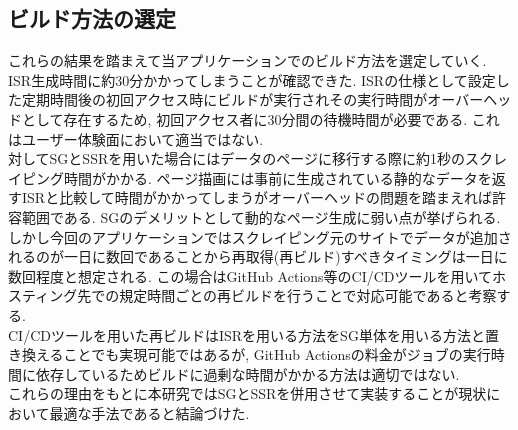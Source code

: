 \subsection{ビルド方法の選定}
これらの結果を踏まえて当アプリケーションでのビルド方法を選定していく.\\
ISR生成時間に約30分かかってしまうことが確認できた. ISRの仕様として設定した定期時間後の初回アクセス時にビルドが実行されその実行時間がオーバーヘッドとして存在するため, 初回アクセス者に30分間の待機時間が必要である.
これはユーザー体験面において適当ではない.\\
対してSGとSSRを用いた場合にはデータのページに移行する際に約1秒のスクレイピング時間がかかる. 
ページ描画には事前に生成されている静的なデータを返すISRと比較して時間がかかってしまうがオーバーヘッドの問題を踏まえれば許容範囲である.
SGのデメリットとして動的なページ生成に弱い点が挙げられる.
しかし今回のアプリケーションではスクレイピング元のサイトでデータが追加されるのが一日に数回であることから再取得(再ビルド)すべきタイミングは一日に数回程度と想定される.
この場合はGitHub Actions等のCI/CDツールを用いてホスティング先での規定時間ごとの再ビルドを行うことで対応可能であると考察する.\\
CI/CDツールを用いた再ビルドはISRを用いる方法をSG単体を用いる方法と置き換えることでも実現可能ではあるが, GitHub Actionsの料金がジョブの実行時間に依存しているためビルドに過剰な時間がかかる方法は適切ではない.\\
これらの理由をもとに本研究ではSGとSSRを併用させて実装することが現状において最適な手法であると結論づけた.

